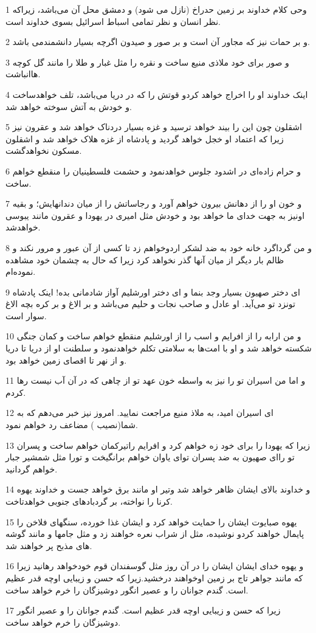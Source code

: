 \par 1 وحی کلام خداوند بر زمین حدراخ (نازل می شود) و دمشق محل آن می‌باشد، زیراکه نظر انسان و نظر تمامی اسباط اسرائیل بسوی خداوند است.
\par 2 و بر حمات نیز که مجاور آن است و بر صور و صیدون اگر‌چه بسیار دانشمندمی باشد.
\par 3 و صور برای خود ملاذی منیع ساخت و نقره را مثل غبار و طلا را مانند گل کوچه هاانباشت.
\par 4 اینک خداوند او را اخراج خواهد کردو قوتش را که در دریا می‌باشد، تلف خواهدساخت و خودش به آتش سوخته خواهد شد.
\par 5 اشقلون چون این را بیند خواهد ترسید و غزه بسیار دردناک خواهد شد و عقرون نیز زیرا که اعتماد او خجل خواهد گردید و پادشاه از غزه هلاک خواهد شد و اشقلون مسکون نخواهدگشت.
\par 6 و حرام زاده‌ای در اشدود جلوس خواهدنمود و حشمت فلسطینیان را منقطع خواهم ساخت.
\par 7 و خون او را از دهانش بیرون خواهم آورد و رجاساتش را از میان دندانهایش؛ و بقیه اونیز به جهت خدای ما خواهد بود و خودش مثل امیری در یهودا و عقرون مانند یبوسی خواهدشد.
\par 8 و من گرداگرد خانه خود به ضد لشکر اردوخواهم زد تا کسی از آن عبور و مرور نکند و ظالم بار دیگر از میان آنها گذر نخواهد کرد زیرا که حال به چشمان خود مشاهده نموده‌ام.
\par 9 ‌ای دختر صهیون بسیار وجد بنما و ای دختر اورشلیم آواز شادمانی بده! اینک پادشاه تونزد تو می‌آید. او عادل و صاحب نجات و حلیم می‌باشد و بر الاغ و بر کره بچه الاغ سوار است.
\par 10 و من ارابه را از افرایم و اسب را از اورشلیم منقطع خواهم ساخت و کمان جنگی شکسته خواهد شد و او با امت‌ها به سلامتی تکلم خواهدنمود و سلطنت او از دریا تا دریا و از نهر تا اقصای زمین خواهد بود.
\par 11 و اما من اسیران تو را نیز به واسطه خون عهد تو از چاهی که در آن آب نیست رها کردم.
\par 12 ‌ای اسیران امید، به ملاذ منیع مراجعت نمایید. امروز نیز خبر می‌دهم که به شما(نصیب ) مضاعف رد خواهم نمود.
\par 13 زیرا که یهودا را برای خود زه خواهم کرد و افرایم راتیرکمان خواهم ساخت و پسران تو را‌ای صهیون به ضد پسران تو‌ای یاوان خواهم برانگیخت و تورا مثل شمشیر جبار خواهم گردانید.
\par 14 و خداوند بالای ایشان ظاهر خواهد شد وتیر او مانند برق خواهد جست و خداوند یهوه کرنا را نواخته، بر گردبادهای جنوبی خواهدتاخت.
\par 15 یهوه صبایوت ایشان را حمایت خواهد کرد و ایشان غذا خورده، سنگهای فلاخن را پایمال خواهند کردو نوشیده، مثل از شراب نعره خواهند زد و مثل جامها و مانند گوشه های مذبح پر خواهند شد.
\par 16 و یهوه خدای ایشان ایشان را در آن روز مثل گوسفندان قوم خودخواهد رهانید زیرا که مانند جواهر تاج بر زمین اوخواهند درخشید.زیرا که حسن و زیبایی اوچه قدر عظیم است. گندم جوانان را و عصیر انگور دوشیزگان را خرم خواهد ساخت.
\par 17 زیرا که حسن و زیبایی اوچه قدر عظیم است. گندم جوانان را و عصیر انگور دوشیزگان را خرم خواهد ساخت.

